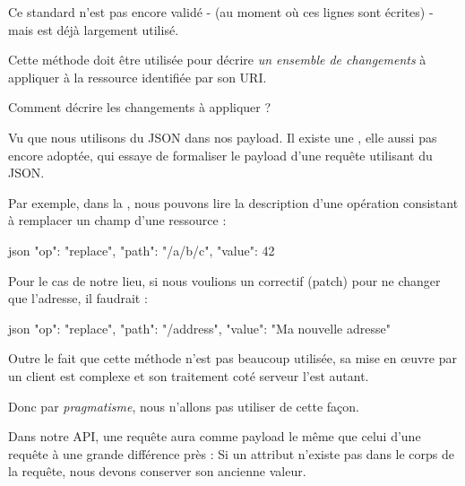 \documentclass[big]{zmdocument}
\begin{document}
Ce standard n'est pas encore validé -  (au moment où ces lignes sont écrites) - mais est déjà largement utilisé.



Cette méthode doit être utilisée pour décrire \textit{un ensemble de changements} à appliquer à la ressource identifiée par son URI.



\begin{Question}
Comment décrire les changements à appliquer ?
\end{Question}


Vu que nous utilisons du JSON dans nos payload. Il existe une , elle aussi pas encore adoptée, qui essaye de formaliser le payload d'une requête  utilisant du JSON.



Par exemple, dans la , nous pouvons lire la description d'une opération consistant à remplacer un champ d'une ressource :



\begin{CodeBlock}{json}
{ "op": "replace", "path": "/a/b/c", "value": 42 }
\end{CodeBlock}



Pour le cas de notre lieu, si nous voulions un correctif (patch) pour ne changer que l'adresse, il faudrait :



\begin{CodeBlock}{json}
{ "op": "replace", "path": "/address", "value": "Ma nouvelle adresse" }
\end{CodeBlock}



Outre le fait que cette méthode n'est pas beaucoup utilisée, sa mise en œuvre par un client est complexe et son traitement coté serveur l'est autant.



Donc par \textit{pragmatisme}, nous n'allons pas utiliser  de cette façon.



Dans notre API, une requête  aura comme payload le même que celui d'une requête  à une grande différence près : Si un attribut n'existe pas dans le corps de la requête, nous devons conserver son ancienne valeur.
\end{document}
